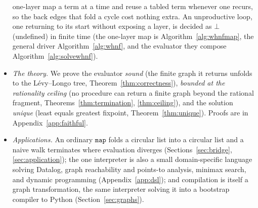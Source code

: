 \begin{CJK*}{UTF8}{gbsn}
\begin{itemize}
      one-layer map a term at a time and reuse a tabled term whenever one recurs, so the back
      edges that fold a cycle cost nothing extra. An unproductive loop, one returning to its
      start without exposing a layer, is decided as $\bot$ (undefined) in finite time
      (the one-layer map is Algorithm~\ref{alg:whnfmap}, the general driver Algorithm~\ref{alg:whnf}, and the evaluator they compose Algorithm~\ref{alg:solvewhnf}).
    \item \emph{The theory.} We prove the evaluator \emph{sound} (the finite graph it returns
      unfolds to the L\'evy--Longo tree, Theorem~\ref{thm:correctness}), \emph{bounded at the rationality ceiling} (no
        procedure can return a finite graph beyond the rational fragment,
        Theorems~\ref{thm:termination},
      \ref{thm:ceiling}), and the solution
      \emph{unique} (least equals greatest fixpoint,
      Theorem~\ref{thm:unique}). Proofs are in Appendix~\ref{app:faithful}.
    \item \emph{Applications.} An ordinary
      $\mathtt{map}$ folds a circular list into a circular list and a naive walk terminates where
      evaluation diverges (Sections~\ref{sec:bridge}, \ref{sec:application}); the one interpreter is also a small
      domain-specific language solving Datalog, graph reachability and points-to analysis, minimax
      search, and dynamic programming (Appendix~\ref{app:dsl}); and compilation is itself a graph
      transformation, the same interpreter solving it into a bootstrap compiler to Python
      (Section~\ref{sec:graphs}).
  \end{itemize}
  \fi


\end{CJK*}
